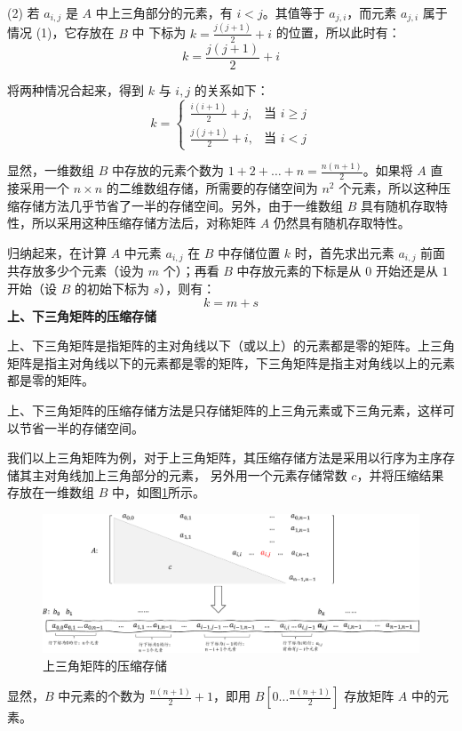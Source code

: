 \documentclass[lang=cn,newtx,10pt,scheme=chinese]{elegantbook}
\begin{document}
(2) 若 $a_{i,j}$ 是 $A$ 中上三角部分的元素，有 $i < j$。其值等于 $a_{j,i}$，而元素 $a_{j,i}$ 属于情况 (1)，它存放在 $B$ 中
下标为 $k = \frac{j(j+1)}{2} + i$ 的位置，所以此时有：
\[
k = \frac{j(j+1)}{2} + i
\]

将两种情况合起来，得到 $k$ 与 $i,j$ 的关系如下：
\[
k =
\begin{cases} 
\frac{i(i+1)}{2} + j, & \text{当 } i \geq j \\ 
\frac{j(j+1)}{2} + i, & \text{当 } i < j 
\end{cases}
\]

显然，一维数组 $B$ 中存放的元素个数为 $1 + 2 + \dots + n = \frac{n(n+1)}{2}$。如果将 $A$ 直接采用一个 $n \times n$ 的二维数组存储，所需要的存储空间为 $n^2$ 个元素，所以这种压缩存储方法几乎节省了一半的存储空间。另外，由于一维数组 $B$ 具有随机存取特性，所以采用这种压缩存储方法后，对称矩阵 $A$ 仍然具有随机存取特性。

归纳起来，在计算 $A$ 中元素 $a_{i,j}$ 在 $B$ 中存储位置 $k$ 时，首先求出元素 $a_{i,j}$ 前面共存放多少个元素（设为 $m$ 个）；再看 $B$ 中存放元素的下标是从 $0$ 开始还是从 $1$ 开始（设 $B$ 的初始下标为 $s$），则有：
\[
k = m + s
\]
\textbf{上、下三角矩阵的压缩存储}

上、下三角矩阵是指矩阵的主对角线以下（或以上）的元素都是零的矩阵。上三角矩阵是指主对角线以下的元素都是零的矩阵，下三角矩阵是指主对角线以上的元素都是零的矩阵。

上、下三角矩阵的压缩存储方法是只存储矩阵的上三角元素或下三角元素，这样可以节省一半的存储空间。

我们以上三角矩阵为例，对于上三角矩阵，其压缩存储方法是采用以行序为主序存储其主对角线加上三角部分的元素，
另外用一个元素存储常数 $c$，并将压缩结果存放在一维数组 $B$ 中，如图\ref{fig:upperMatrix}所示。

\begin{figure}[h]
  \centering
  \includegraphics[width=1\textwidth]{./figure/pdf/cropped/upperMatrix.pdf}
  \caption{上三角矩阵的压缩存储}
  \label{fig:upperMatrix}
\end{figure}
显然，$B$ 中元素的个数为 $\frac{n(n+1)}{2} + 1$，即用 $B[0 \dots \frac{n(n+1)}{2}]$ 存放矩阵 $A$ 中的元素。
\end{document}
